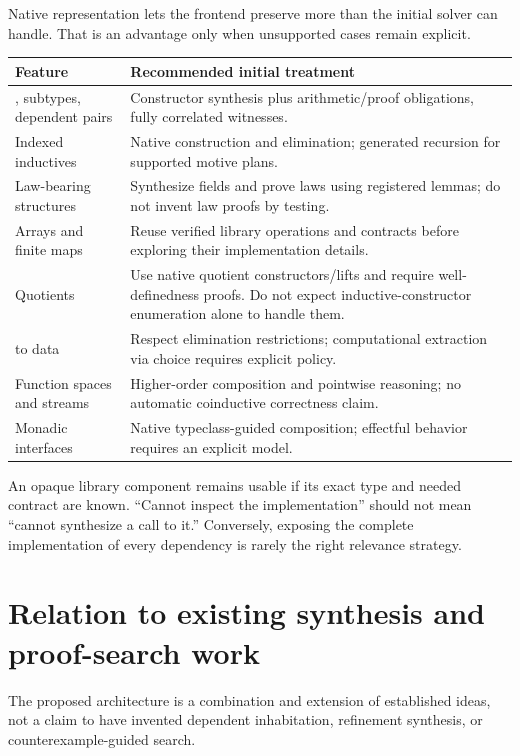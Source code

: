 \documentclass[11pt,a4paper]{article}
\newcommand{\code}[1]{\texttt{\detokenize{#1}}}
\theoremstyle{remark}
\begin{document}
Native representation lets the frontend preserve more than the initial solver can handle. That is an advantage only when unsupported cases remain explicit.
\begin{center}
\begin{tabularx}{\textwidth}{@{}L{0.25\textwidth}Y@{}}
\toprule
Feature & Recommended initial treatment \\
\midrule
\code{Fin}, subtypes, dependent pairs & Constructor synthesis plus arithmetic/proof obligations, fully correlated witnesses. \\
Indexed inductives & Native construction and elimination; generated recursion for supported motive plans. \\
Law-bearing structures & Synthesize fields and prove laws using registered lemmas; do not invent law proofs by testing. \\
Arrays and finite maps & Reuse verified library operations and contracts before exploring their implementation details. \\
Quotients & Use native quotient constructors/lifts and require well-definedness proofs. Do not expect inductive-constructor enumeration alone to handle them. \\
\code{Nonempty} to data & Respect elimination restrictions; computational extraction via choice requires explicit policy. \\
Function spaces and streams & Higher-order composition and pointwise reasoning; no automatic coinductive correctness claim. \\
Monadic interfaces & Native typeclass-guided composition; effectful behavior requires an explicit model. \\
\bottomrule
\end{tabularx}
\end{center}

An opaque library component remains usable if its exact type and needed contract are known. ``Cannot inspect the implementation'' should not mean ``cannot synthesize a call to it.'' Conversely, exposing the complete implementation of every dependency is rarely the right relevance strategy.

\section{Relation to existing synthesis and proof-search work}\label{sec:related}

The proposed architecture is a combination and extension of established ideas, not a claim to have invented dependent inhabitation, refinement synthesis, or counterexample-guided search.
\end{document}
